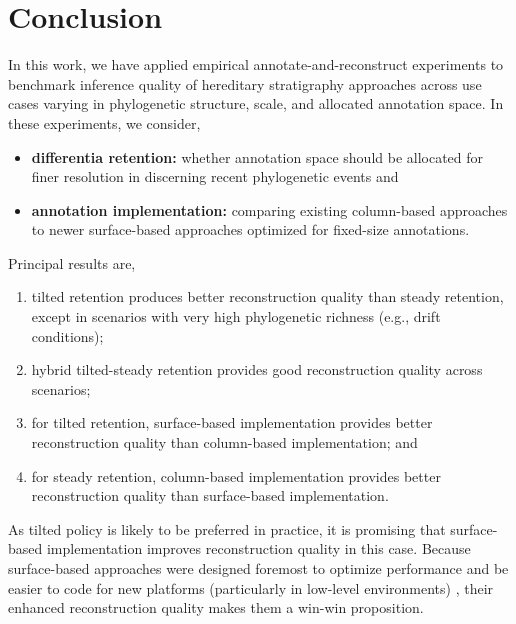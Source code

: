 \section{Conclusion} \label{sec:conclusion}

In this work, we have applied empirical annotate-and-reconstruct experiments to benchmark inference quality of hereditary stratigraphy approaches across use cases varying in phylogenetic structure, scale, and allocated annotation space.
In these experiments, we consider,
\begin{itemize}
\item \textbf{differentia retention:} whether annotation space should be allocated for finer resolution in discerning recent phylogenetic events and
\item \textbf{annotation implementation:} comparing existing column-based approaches to newer surface-based approaches optimized for fixed-size annotations.
\end{itemize}

Principal results are,
\begin{enumerate}
\item tilted retention produces better reconstruction quality than steady retention, except in scenarios with very high phylogenetic richness (e.g., drift conditions);
\item hybrid tilted-steady retention provides good reconstruction quality across scenarios;
\item for tilted retention, surface-based implementation provides better reconstruction quality than column-based implementation; and
\item for steady retention, column-based implementation provides better reconstruction quality than surface-based implementation.
\end{enumerate}

As tilted policy is likely to be preferred in practice, it is promising that surface-based implementation improves reconstruction quality in this case.
Because surface-based approaches were designed foremost to optimize performance and be easier to code for new platforms (particularly in low-level environments) \citep{moreno2024trackable}, their enhanced reconstruction quality makes them a win-win proposition.

